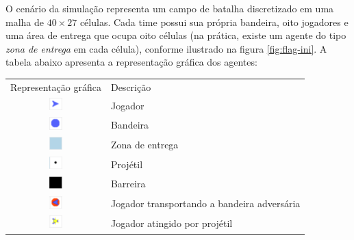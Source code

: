 \documentclass[preprint,12pt]{elsarticle}
\begin{document}
O cenário da simulação representa um campo de batalha discretizado em uma malha de $40 \times 27$ células. Cada time possui sua própria bandeira, oito jogadores e uma área de entrega que ocupa oito células (na prática, existe um agente do tipo \textit{zona de entrega} em cada célula), conforme ilustrado na figura \ref{fig:flag-ini}. A tabela abaixo apresenta a representação gráfica dos agentes:

\begin{table}[h!]
	\begin{center}
		\begin{tabular}{ c  p{8cm} }
			\toprule
			Representação gráfica & Descrição \\ 
			\cmidrule(r){1-1}\cmidrule(lr){2-2}
			
			\includegraphics[width=5mm, height=5mm]{figures/player.png}
			& 
			Jogador \\
			
			\includegraphics[width=5mm, height=5mm]{figures/flag.png}
			& 
			Bandeira \\
			
			\includegraphics[width=5mm, height=5mm]{figures/delivery.png}
			& 
			Zona de entrega \\
			
			\includegraphics[width=5mm, height=5mm]{figures/fireshot.png}
			& 
			Projétil \\
			
			\includegraphics[width=5mm, height=5mm]{figures/wall.png}
			& 
			Barreira \\
			
			\includegraphics[width=5mm, height=5mm]{figures/player_with_flag.png}
			& 
			Jogador transportando a bandeira adversária \\
			
			\includegraphics[width=5mm, height=5mm]{figures/fired_player_3.png}
			& 
			Jogador atingido por projétil \\
			

\end{tabular}
\end{center}
\end{table}
\end{document}
